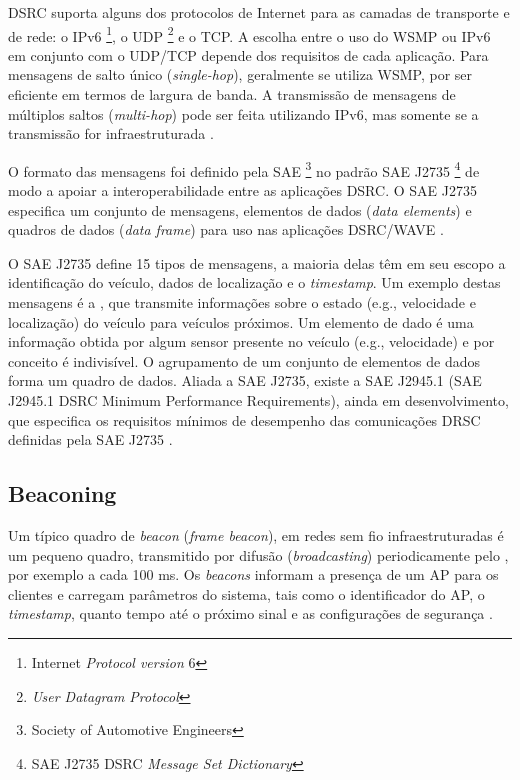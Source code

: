 \documentclass[mestrado, pre-defesa, english, brazil]{packages/icmc}
\begin{document}
DSRC suporta alguns dos protocolos de Internet para as camadas de transporte e de rede: o IPv6 \footnote{Internet \textit{Protocol version} 6}, o UDP \footnote{\textit{User Datagram Protocol}} e o TCP. A escolha entre o uso do WSMP ou IPv6 em conjunto com o UDP/TCP depende dos requisitos de cada aplicação. Para mensagens de salto único (\textit{single-hop}), geralmente se utiliza WSMP, por ser eficiente em termos de largura de banda. A transmissão de mensagens de múltiplos saltos (\textit{multi-hop}) pode ser feita utilizando IPv6, mas somente se a transmissão for infraestruturada \cite{kenney-2011}.

O formato das mensagens foi definido pela SAE \footnote{Society of Automotive Engineers} no padrão SAE J2735 \footnote{SAE J2735 DSRC \textit{Message Set Dictionary}} de modo a apoiar a interoperabilidade entre as aplicações DSRC. O SAE J2735 especifica um conjunto de mensagens, elementos de dados (\textit{data elements}) e quadros de dados (\textit{data frame}) para uso nas aplicações DSRC/WAVE \cite{kenney-2011,li-2012,Yokoyama-2014,grilli-2010}.

O SAE J2735 define 15 tipos de mensagens, a maioria delas têm em seu escopo a identificação do veículo, dados de localização e o \textit{timestamp}. Um exemplo destas mensagens é a , que transmite informações sobre o estado (e.g., velocidade e localização) do veículo para veículos próximos. Um elemento de dado é uma informação obtida por algum sensor presente no veículo (e.g., velocidade) e por conceito é indivisível. O agrupamento de um conjunto de elementos de dados forma um quadro de dados. Aliada a SAE J2735, existe a SAE J2945.1 (SAE J2945.1 DSRC Minimum Performance Requirements), ainda em desenvolvimento, que especifica os requisitos mínimos de desempenho das comunicações DRSC definidas pela SAE J2735 \cite{li-2012,grilli-2010,kenney-2011}. 

\subsection{Beaconing} \label{beacons}

Um típico quadro de \textit{beacon} (\textit{frame beacon}), em redes sem fio infraestruturadas é um pequeno quadro, transmitido por difusão (\textit{broadcasting}) periodicamente pelo , por exemplo a cada 100 ms. Os \textit{beacons} informam a presença de um AP para os clientes e carregam parâmetros do sistema, tais como o identificador do AP, o \textit{timestamp}, quanto tempo até o próximo sinal e as configurações de segurança \cite{Kurose-2012,Tanenbaum-2011}.
\end{document}
